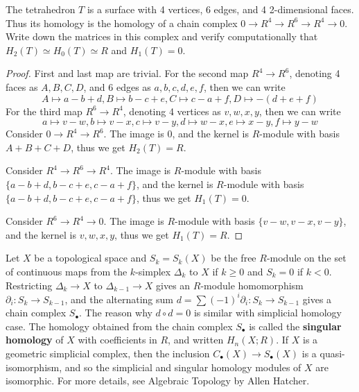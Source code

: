 \begin{exer}[Tetrahedron] The tetrahedron $T$ is a surface with 4 vertices, 6 edges, and 4 2-dimensional faces. Thus its homology is the homology of a chain complex $0\rightarrow R^4\rightarrow R^6\rightarrow R^4\rightarrow 0$. Write down the matrices in this complex and verify computationally that $H_2(T)\simeq H_0(T)\simeq R$ and $H_1(T)=0$.
\end{exer}
\begin{proof}
First and last map are trivial. For the second map $R^4\rightarrow R^6$, denoting 4 faces as $A,B,C,D$, and 6 edges as $a,b,c,d,e,f$, then we can write
\begin{equation}
A\mapsto a-b+d, B\mapsto b-c+e, C\mapsto c-a+f, D\mapsto -(d+e+f)
\end{equation}
For the third map $R^6\rightarrow R^4$, denoting 4 vertices as $v,w,x,y$, then we can write
\begin{equation}
a\mapsto v-w, b\mapsto v-x, c\mapsto v-y, d\mapsto w-x, e\mapsto x-y, f\mapsto y-w
\end{equation}
Consider $0\rightarrow R^4\rightarrow R^6$. The image is $0$, and the kernel is $R$-module with basis $A+B+C+D$, thus we get $H_2(T)=R$.

Consider $R^4\rightarrow R^6\rightarrow R^4$. The image is $R$-module with basis $\{a-b+d,b-c+e,c-a+f\}$, and the kernel is $R$-module with basis $\{a-b+d, b-c+e, c-a+f\}$, thus we get $H_1(T)=0$.

Consider $R^6\rightarrow R^4\rightarrow 0$. The image is $R$-module with basis $\{v-w,v-x,v-y\}$, and the kernel is $v,w,x,y$, thus we get $H_1(T)=R$.
\end{proof}

\begin{exmp} Let $X$ be a topological space and $S_k=S_k(X)$ be the free $R$-module on the set of continuous maps from the $k$-simplex $\Delta_k$ to $X$ if $k\geq 0$ and $S_k=0$ if $k<0$. Restricting $\Delta_k\rightarrow X$ to $\Delta_{k-1}\rightarrow X$ gives an $R$-module homomorphism $\partial_i:S_k\rightarrow S_{k-1}$, and the alternating sum $d=\sum(-1)^i\partial_i:S_k\rightarrow S_{k-1}$ gives a chain complex $S_\bullet$. The reason why $d\circ d=0$ is similar with simplicial homology case. The homology obtained from the chain complex $S_\bullet$ is called the \textbf{singular homology} of $X$ with coefficients in $R$, and written $H_n(X;R)$. If $X$ is a geometric simplicial complex, then the inclusion $C_\bullet(X)\rightarrow S_\bullet(X)$ is a quasi-isomorphism, and so the simplicial and singular homology modules of $X$ are isomorphic. For more details, see Algebraic Topology by Allen Hatcher.
\end{exmp}

